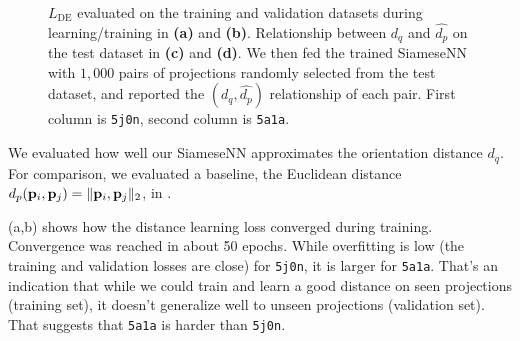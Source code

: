 \begin{figure}
\begin{subfigure}[b]{0.49\linewidth}
        \caption{}
    \end{subfigure}
    \caption{%
        $L_\text{DE}$  evaluated on the training and validation datasets during learning/training in \textbf{(a)} and \textbf{(b)}.
        Relationship between $d_q$ and $\widehat{d_p}$ on the test dataset in \textbf{(c)} and \textbf{(d)}.
        We then fed the trained SiameseNN with $1,000$ pairs of projections randomly selected from the test dataset, and reported the $(d_q,\widehat{d_p})$ relationship of each pair.
        First column is \texttt{5j0n}, second column is \texttt{5a1a}.
    }\label{fig:losses-siamese}
\end{figure}

We evaluated how well our SiameseNN approximates the orientation distance $d_q$.
For comparison, we evaluated a baseline, the Euclidean distance $d_p(\mathbf{p}_i,\mathbf{p}_j) = \|\mathbf{p}_i, \mathbf{p}_j\|_2$, in .

(a,b) shows how the distance learning loss converged during training.
Convergence was reached in about 50 epochs. %
While overfitting is low (the training and validation losses are close) for \texttt{5j0n}, it is larger for \texttt{5a1a}.
That's an indication that while we could train and learn a good distance on seen projections (training set), it doesn't generalize well to unseen projections (validation set).
That suggests that \texttt{5a1a} is harder than \texttt{5j0n}. 

